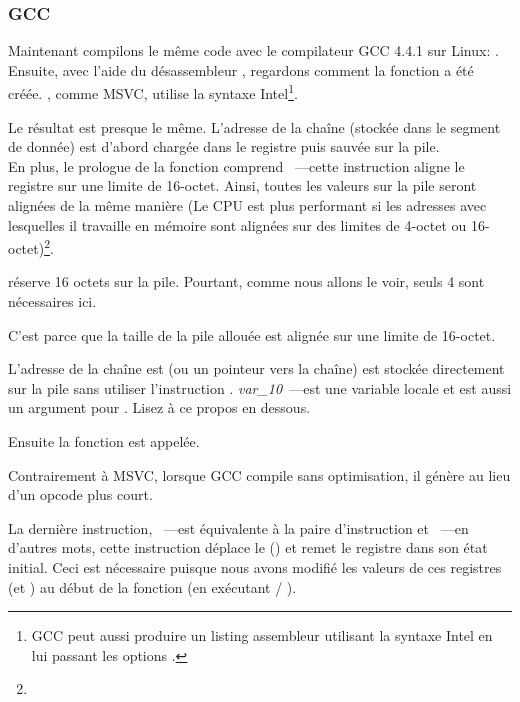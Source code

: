 ﻿\subsubsection{GCC}

Maintenant compilons le même code \CCpp avec le compilateur GCC 4.4.1 sur Linux: .
Ensuite, avec l'aide du désassembleur \IDA, regardons comment la fonction \main a été créée.
\IDA, comme MSVC, utilise la syntaxe Intel\footnote{GCC peut aussi produire un listing assembleur utilisant la syntaxe Intel en lui passant les options .}.



Le résultat est presque le même.
L'adresse de la chaîne  (stockée dans le segment de donnée) est d'abord chargée dans
 le registre \EAX puis sauvée sur la pile.\\
En plus, le prologue de la fonction comprend ~---cette
instruction aligne le registre \ESP sur une limite de 16-octet.
Ainsi, toutes les valeurs sur la pile seront alignées de la même manière (Le CPU
est plus performant si les adresses avec lesquelles il travaille en mémoire sont
alignées sur des limites de 4-octet ou 16-octet)\footnote{\URLWPDA}.

 réserve 16 octets sur la pile. Pourtant, comme nous allons le voir, seuls 4 sont nécessaires ici.

C'est parce que la taille de la pile allouée est alignée sur une limite de 16-octet.

L'adresse de la chaîne est (ou un pointeur vers la chaîne) est stockée directement sur la pile sans utiliser
l'instruction \PUSH.
\emph{var\_10}~---est une variable locale et est aussi un argument pour \printf{}.
Lisez à ce propos en dessous.

Ensuite la fonction \printf est appelée.

Contrairement à MSVC, lorsque GCC compile sans optimisation, il génère  au lieu d'un opcode plus court.

La dernière instruction, \LEAVE~---est équivalente à la paire d'instruction  et ~---en d'autres mots,
cette instruction déplace le  (\ESP) et remet le registre \EBP dans son état initial.
Ceci est nécessaire puisque nous avons modifié les valeurs de ces registres (\ESP et \EBP) au début de la fonction (en exécutant  / ).

